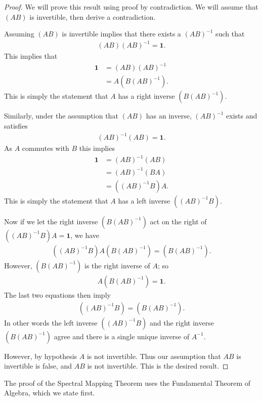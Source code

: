 \begin{proof}
    \leanok
We will prove this result using proof by contradiction. We will assume that $(AB)$ is invertible, then derive a contradiction.

Assuming $(AB)$ is invertible implies that there exists a $(AB)^{-1}$ such that
\begin{align}
    (AB)(AB)^{-1} = \mathbf{1}.
\end{align}
This implies that
\begin{align}
    \mathbf{1} &= (AB)(AB)^{-1} \\
               &= A(B(AB)^{-1}).
\end{align}
This is simply the statement that $A$ has a right inverse $(B(AB)^{-1})$.

Similarly, under the assumption that $(AB)$ has an inverse, $(AB)^{-1}$ exists and satisfies
\begin{align}
    (AB)^{-1}(AB) = \mathbf{1}.
\end{align}
As $A$ commutes with $B$ this implies
\begin{align}
    \mathbf{1} &= (AB)^{-1}(AB) \\
               &= (AB)^{-1}(BA) \\
               &= ((AB)^{-1}B)A.
\end{align}
This is simply the statement that $A$ has a left inverse $((AB)^{-1}B)$.

Now if we let the right inverse $(B(AB)^{-1})$ act on the right of $((AB)^{-1}B)A = \mathbf{1}$, we have
\begin{align}
    ((AB)^{-1}B)A(B(AB)^{-1}) = (B(AB)^{-1}).
\end{align}
However, $(B(AB)^{-1})$ is the right inverse of $A$; so
\begin{align}
    A(B(AB)^{-1}) = \mathbf{1}.
\end{align}
The last two equations then imply
\begin{align}
    ((AB)^{-1}B) = (B(AB)^{-1}).
\end{align}
In other words the left inverse $((AB)^{-1}B)$ and the right inverse $(B(AB)^{-1})$ agree and there is a single unique inverse of $A^{-1}$.

However, by hypothesis $A$ is not invertible. Thus our assumption that $AB$ is invertible is false, and $AB$ is not invertible. This is the desired result.
\end{proof}

The proof of the Spectral Mapping Theorem uses the Fundamental Theorem of Algebra, which we state first.

